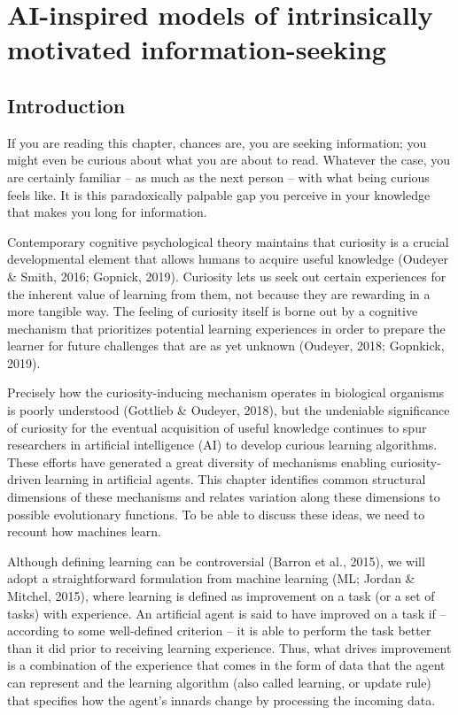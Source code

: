 \chapter{AI-inspired models of intrinsically motivated information-seeking}\label{ch:ai}


\section{Introduction}
If you are reading this chapter, chances are, you are seeking information; you might even be curious about what you are about to read. Whatever the case, you are certainly familiar -- as much as the next person -- with what being curious feels like. It is this paradoxically palpable gap you perceive in your knowledge that makes you long for information. 

Contemporary cognitive psychological theory maintains that curiosity is a crucial developmental element that allows humans to acquire useful knowledge (Oudeyer \& Smith, 2016; Gopnick, 2019). Curiosity lets us seek out certain experiences for the inherent value of learning from them, not because they are rewarding in a more tangible way. The feeling of curiosity itself is borne out by a cognitive mechanism that prioritizes potential learning experiences in order to prepare the learner for future challenges that are as yet unknown (Oudeyer, 2018; Gopnkick, 2019).

Precisely how the curiosity-inducing mechanism operates in biological organisms is poorly understood (Gottlieb \& Oudeyer, 2018), but the undeniable significance of curiosity for the eventual acquisition of useful knowledge continues to spur researchers in artificial intelligence (AI) to develop curious learning algorithms. These efforts have generated a great diversity of mechanisms enabling curiosity-driven learning in artificial agents. This chapter identifies common structural dimensions of these mechanisms and relates variation along these dimensions to possible evolutionary functions. To be able to discuss these ideas, we need to recount how machines learn.

Although defining learning can be controversial (Barron et al., 2015), we will adopt a straightforward formulation from machine learning (ML; Jordan \& Mitchel, 2015), where learning is defined as improvement on a task (or a set of tasks) with experience. An artificial agent is said to have improved on a task if -- according to some well-defined criterion -- it is able to perform the task better than it did prior to receiving learning experience. Thus, what drives improvement is a combination of the experience that comes in the form of data that the agent can represent and the learning algorithm (also called learning, or update rule) that specifies how the agent’s innards change by processing the incoming data.

